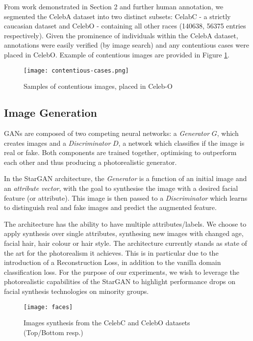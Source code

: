 \documentclass[10pt,twocolumn,letterpaper]{article}
\begin{document}
From work demonstrated in Section 2 and further human annotation, we segmented the CelebA dataset into two distinct subsets: CelabC - a strictly caucasian dataset and CelebO - containing all other races (140638, 56375 entries respectively). Given the prominence of individuals within the CelebA dataset, annotations were easily verified (by image search) and any contentious cases were placed in CelebO. Example of contentious images are provided in Figure \ref{fig:contentious}.


\begin{figure}[ht]
\begin{center}
   \texttt{[image: contentious-cases.png]}
\end{center}
   \caption{ \label{fig:contentious} Samples of contentious images, placed in Celeb-O}
\label{fig:contentious}
\end{figure}


\subsection{Image Generation}
GANs are composed of two competing neural networks: a \textit{Generator} $G$, which creates images and a \textit{Discriminator} $D$, a network which classifies if the image is real or fake. Both components are trained together, optimising to outperform each other and thus producing a photorealistic generator.

In the StarGAN architecture, the \textit{Generator} is a function of an initial image and an \textit{attribute vector}, with the goal to synthesise the image with a desired facial feature (or attribute). This image is then passed to a \textit{Discriminator} which learns to distinguish real and fake images and predict the augmented feature.

The architecture has the ability to have multiple attributes/labels. We choose to apply synthesis over single attributes, synthesing new images with changed age, facial hair, hair colour or hair style. The architecture currently stands as state of the art for the photorealism it achieves. This is in particular due to the introduction of a Reconstruction Loss, in addition to the vanilla domain classification loss. For the purpose of our experiments, we wish to leverage the photorealistic capabilities of the StarGAN to highlight performance drops on facial synthesis technologies on minority groups.


\begin{figure*}[h!]
\begin{center}
\texttt{[image: faces]}
\end{center}
  \caption{Images synthesis from the CelebC and CelebO datasets (Top/Bottom resp.) \label{generated}}

\end{figure*}
\end{document}
